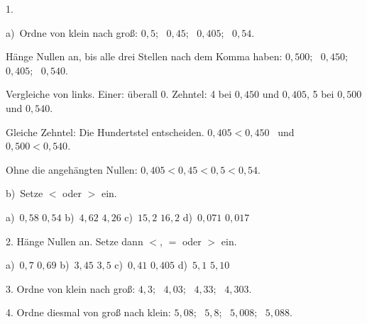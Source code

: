 \documentclass[11pt]{article}
\newcommand{\kennung}{HMF}
\newcommand{\grau}[1]{{\color{mbgrau}#1}}
\begin{document}
\pfheftstil
\fancyfoot[C]{\parbox[t]{\textwidth}{\mbfhbox\par\vspace{1.5mm}{\footnotesize\color{mbgrau}{\scriptsize \kennung}\hfill\thepage}}}
\begin{pfaufg}{}{1.}{}
\grau{a)\ Ordne von klein nach groß: $0{,}5$; \ $0{,}45$; \ $0{,}405$; \ $0{,}54$.\par\smallskip Hänge Nullen an, bis alle drei Stellen nach dem Komma haben: $0{,}500$; \ $0{,}450$; \ $0{,}405$; \ $0{,}540$.\par Vergleiche von links. Einer: überall 0. Zehntel: 4 bei $0{,}450$ und $0{,}405$, 5 bei $0{,}500$ und $0{,}540$.\par Gleiche Zehntel: Die Hundertstel entscheiden. $0{,}405 < 0{,}450$ \ und \ $0{,}500 < 0{,}540$.\par Ohne die angehängten Nullen: $0{,}405 < 0{,}45 < 0{,}5 < 0{,}54$.}
\par\medskip
b)\ Setze $<$ oder $>$ ein.\par\vspace{3pt} a)~$0{,}58$ \leerfeld $0{,}54$ \qquad b)~$4{,}62$ \leerfeld $4{,}26$ \qquad c)~$15{,}2$ \leerfeld $16{,}2$ \qquad d)~$0{,}071$ \leerfeld $0{,}017$
\end{pfaufg}

\begin{pfaufg}{}{2.}{}
Hänge Nullen an. Setze dann $<$, $=$ oder $>$ ein.\par\vspace{3pt} a)~$0{,}7$ \leerfeld $0{,}69$ \qquad b)~$3{,}45$ \leerfeld $3{,}5$ \qquad c)~$0{,}41$ \leerfeld $0{,}405$ \qquad d)~$5{,}1$ \leerfeld $5{,}10$
\end{pfaufg}

\begin{pfaufg}{}{3.}{}
Ordne von klein nach groß: $4{,}3$; \ $4{,}03$; \ $4{,}33$; \ $4{,}303$.
\end{pfaufg}

\begin{pfaufg}{}{4.}{}
Ordne diesmal von groß nach klein: $5{,}08$; \ $5{,}8$; \ $5{,}008$; \ $5{,}088$.
\end{pfaufg}
\end{document}
